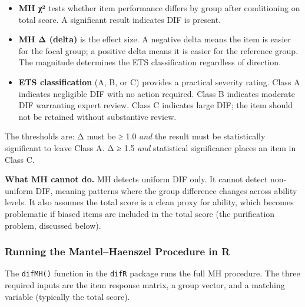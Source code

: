 \documentclass[
  11pt,
  letterpaper,
]{scrbook}
\providecommand{\tightlist}{%
  \setlength{\itemsep}{0pt}\setlength{\parskip}{0pt}}
\begin{document}
\begin{itemize}
\tightlist
\item
  \textbf{MH χ²} tests whether item performance differs by group after
  conditioning on total score. A significant result indicates DIF is
  present.
\item
  \textbf{MH Δ (delta)} is the effect size. A negative delta means the
  item is easier for the focal group; a positive delta means it is
  easier for the reference group. The magnitude determines the ETS
  classification regardless of direction.
\item
  \textbf{ETS classification} (A, B, or C) provides a practical severity
  rating. Class A indicates negligible DIF with no action required.
  Class B indicates moderate DIF warranting expert review. Class C
  indicates large DIF; the item should not be retained without
  substantive review.
\end{itemize}

The thresholds are: \textbar Δ\textbar{} must be ≥ 1.0 \emph{and} the
result must be statistically significant to leave Class A.
\textbar Δ\textbar{} ≥ 1.5 \emph{and} statistical significance places an
item in Class C.

\textbf{What MH cannot do.} MH detects uniform DIF only. It cannot
detect non-uniform DIF, meaning patterns where the group difference
changes across ability levels. It also assumes the total score is a
clean proxy for ability, which becomes problematic if biased items are
included in the total score (the purification problem, discussed below).

\subsubsection{Running the Mantel--Haenszel Procedure in
R}\label{running-the-mantelhaenszel-procedure-in-r}

The \texttt{difMH()} function in the \texttt{difR} package runs the full
MH procedure. The three required inputs are the item response matrix, a
group vector, and a matching variable (typically the total score).
\end{document}
